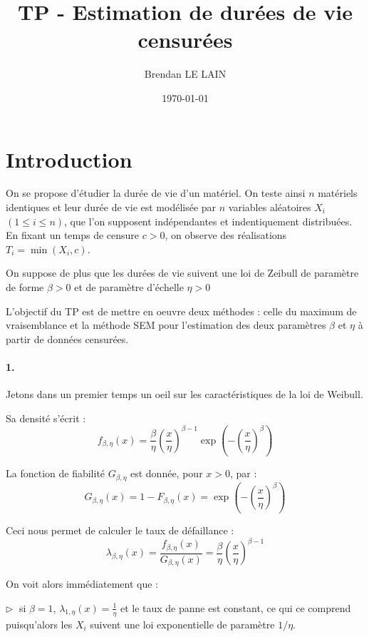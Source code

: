 \documentclass[a4paper]{report}
\title {TP - Estimation de durées de vie censurées}
\author {Brendan LE LAIN}
\date{\today}
\begin{document}
 
\pagestyle{headings}
 
\maketitle
 
 \tableofcontents
\chapter {Introduction}

On se propose d'étudier la durée de vie d'un matériel. On teste ainsi $n$ matériels identiques et leur durée de vie est modélisée par $n$ variables aléatoires $X_i$ $(1 \le i \le n)$, que l'on supposent indépendantes et indentiquement distribuées. En fixant un temps de censure $c > 0$, on observe des réalisations $T_i = \min (X_i,c)$.

On suppose de plus que les durées de vie suivent une loi de Zeibull de paramètre de forme $\beta >0$ et de paramètre d'échelle $\eta >0$

L'objectif du TP est de mettre en oeuvre deux méthodes : celle du maximum de vraisemblance et la méthode SEM pour l'estimation des deux paramètres $\beta$ et $\eta$ à partir de données censurées.

\subsubsection{1.}

Jetons dans un premier temps un oeil sur les caractéristiques de la loi de Weibull.

Sa densité s'écrit : 
\[f_{\beta,\eta}(x)=\frac{\beta}{\eta} \left(\frac{x}{\eta}\right)^{\beta-1} \exp\left(-\left(\frac{x}{\eta}\right)^{\beta}\right)\]

La fonction de fiabilité $G_{\beta,\eta}$ est donnée, pour $x>0$, par :
\[G_{\beta,\eta}(x)=1-F_{\beta,\eta}(x)=\exp\left(-\left(\frac{x}{\eta}\right)^{\beta}\right)\]

 Ceci nous permet de calculer le taux de défaillance : 
 \[\lambda_{\beta,\eta}(x)=\frac{f_{\beta,\eta}(x)}{G_{\beta,\eta}(x)}=\frac{\beta}{\eta} \left(\frac{x}{\eta}\right)^{\beta-1}\]
 
 On voit alors immédiatement que :
 
 $\triangleright \; $ si $\beta=1$, $\lambda_{1,\eta}(x)=\frac{1}{\eta}$ et le taux de panne est constant, ce qui ce comprend puisqu'alors les $X_i$ suivent une loi exponentielle de paramètre $1/\eta$.
 
\end{document}
